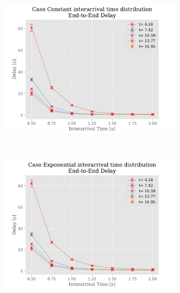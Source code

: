 \documentclass[a4paper,12pt]{article}
\begin{document}
\begin{figure}[H]
  \centering
  \begin{subfigure}[b]{.45\textwidth}
    \includegraphics[width=\textwidth]{img/DelayP2Const.pdf}
    \label{fig:exp:const:delay}
  \end{subfigure}
  ~
  \begin{subfigure}[b]{.45\textwidth}
    \includegraphics[width=\textwidth]{img/DelayP2Exp.pdf}
    \label{fig:exp:exp:delay}
  \end{subfigure}
  \\
  \begin{subfigure}[b]{.45\textwidth}

\end{subfigure}
\end{figure}
\end{document}
